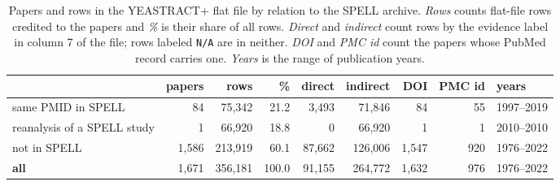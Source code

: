 \begin{table}[H]\centering
\footnotesize
\caption[]{Papers and rows in the YEASTRACT+ flat file by relation to the SPELL
archive. \emph{Rows} counts flat-file rows credited to the papers and \emph{\%}
is their share of all rows. \emph{Direct} and \emph{indirect} count rows by the
evidence label in column 7 of the file; rows labeled \texttt{N/A} are in
neither. \emph{DOI} and \emph{PMC id} count the papers whose PubMed record
carries one. \emph{Years} is the range of publication years.}\label{tab:summary}
\begin{tabular}{lrrrrrrrl}
\toprule
& papers & rows & \% & direct & indirect & DOI & PMC id & years \\
\midrule
same PMID in SPELL & 84 & 75,342 & 21.2 & 3,493 & 71,846 & 84 & 55 & 1997--2019 \\
reanalysis of a SPELL study & 1 & 66,920 & 18.8 & 0 & 66,920 & 1 & 1 & 2010--2010 \\
not in SPELL & 1,586 & 213,919 & 60.1 & 87,662 & 126,006 & 1,547 & 920 & 1976--2022 \\
\midrule
\textbf{all} & 1,671 & 356,181 & 100.0 & 91,155 & 264,772 & 1,632 & 976 & 1976--2022 \\
\bottomrule
\end{tabular}
\end{table}
